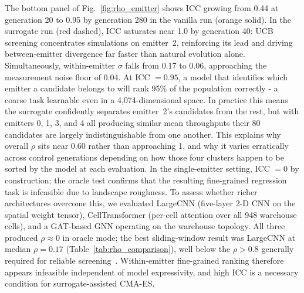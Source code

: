 \documentclass[conference]{IEEEtran}
\begin{document}
The bottom panel of Fig.~\ref{fig:rho_emitter} shows ICC growing from
0.44 at generation 20 to 0.95 by generation 280 in the vanilla run
(orange solid).
In the surrogate run (red dashed), ICC saturates near 1.0 by generation
40: UCB screening concentrates simulations on emitter~2, reinforcing its
lead and driving between-emitter divergence far faster than natural
evolution alone.
Simultaneously, within-emitter $\sigma$ falls from 0.17 to 0.06,
approaching the measurement noise floor of 0.04.
At ICC $= 0.95$, a model that identifies which emitter a candidate
belongs to will rank 95\% of the population correctly - a coarse
task learnable even in a 4,074-dimensional space.
In practice this means the surrogate confidently separates emitter~2's
candidates from the rest, but with emitters 0, 1, 3, and 4 all producing
similar mean throughputs their 80 candidates are largely indistinguishable
from one another. This explains why overall $\rho$ sits near 0.60 rather
than approaching 1, and why it varies erratically across control
generations depending on how those four clusters happen to be sorted by
the model at each evaluation.
In the single-emitter setting, ICC $= 0$ by construction; the oracle
test confirms that the resulting fine-grained regression task is
infeasible due to landscape roughness.
To assess whether richer architectures overcome this, we evaluated
LargeCNN (five-layer 2-D CNN on the spatial weight tensor),
CellTransformer (per-cell attention over all 948 warehouse cells), and a
GAT-based GNN operating on the warehouse topology. All three produced
$\rho \approx 0$ in oracle mode; the best sliding-window result was
LargeCNN at median $\rho = 0.17$ (Table~\ref{tab:rho_comparison}), well
below the $\rho > 0.8$ generally required for reliable
screening~\cite{jin2011,hansen2019,akimoto2022}.
Within-emitter fine-grained ranking therefore appears infeasible
independent of model expressivity, and high ICC is a necessary condition
for surrogate-assisted CMA-ES.
\end{document}
